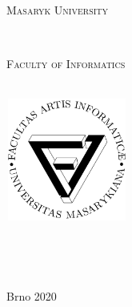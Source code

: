\begin{titlepage}
  \vspace*{1.5cm}
  \makeatletter

  \begin{center}
    \begin{LARGE}
        \textsc{Masaryk University}
    \end{LARGE}\\
    \begin{Large}
        \textsc{Faculty of Informatics}
    \end{Large}\\[1cm]
    \includegraphics[width=4cm, height=4cm] {fi_logo.pdf}\\[2cm]
    \begin{Huge}
      \@title
    \end{Huge}\\[1.25cm]
    \begin{Large}
      \@subtitle
    \end{Large}\\[1.5cm]
    \begin{LARGE}
    \@author
    \end{LARGE}
    \vfill
    {\hfill\large Brno 2020}
  \end{center}
  \makeatother
\end{titlepage}

\newpage
\null
\thispagestyle{empty}
\newpage
